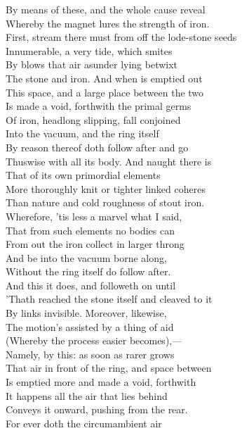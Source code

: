 By means of these, and the whole cause reveal\\
Whereby the magnet lures the strength of iron.\\
First, stream there must from off the lode-stone seeds\\
Innumerable, a very tide, which smites\\
By blows that air asunder lying betwixt\\
The stone and iron. And when is emptied out\\
This space, and a large place between the two\\
Is made a void, forthwith the primal germs\\
Of iron, headlong slipping, fall conjoined\\
Into the vacuum, and the ring itself\\
By reason thereof doth follow after and go\\
Thuswise with all its body. And naught there is\\
That of its own primordial elements\\
More thoroughly knit or tighter linked coheres\\
Than nature and cold roughness of stout iron.\\
Wherefore, 'tis less a marvel what I said,\\
That from such elements no bodies can\\
From out the iron collect in larger throng\\
And be into the vacuum borne along,\\
Without the ring itself do follow after.\\
And this it does, and followeth on until\\
'Thath reached the stone itself and cleaved to it\\
By links invisible. Moreover, likewise,\\
The motion's assisted by a thing of aid\\
(Whereby the process easier becomes),—\\
Namely, by this: as soon as rarer grows\\
That air in front of the ring, and space between\\
Is emptied more and made a void, forthwith\\
It happens all the air that lies behind\\
Conveys it onward, pushing from the rear.\\
For ever doth the circumambient air\\
